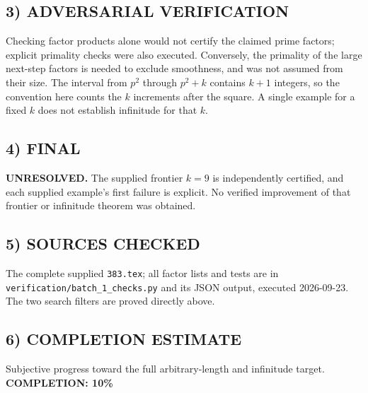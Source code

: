 \subsection*{3) ADVERSARIAL VERIFICATION}
Checking factor products alone would not certify the claimed prime factors; explicit primality checks were also executed. Conversely, the primality of the large next-step factors is needed to exclude smoothness, and was not assumed from their size. The interval from $p^2$ through $p^2+k$ contains $k+1$ integers, so the convention here counts the $k$ increments after the square. A single example for a fixed $k$ does not establish infinitude for that $k$.
\subsection*{4) FINAL}
\textbf{UNRESOLVED.} The supplied frontier $k=9$ is independently certified, and each supplied example's first failure is explicit. No verified improvement of that frontier or infinitude theorem was obtained.
\subsection*{5) SOURCES CHECKED}
The complete supplied \texttt{383.tex}; all factor lists and tests are in \texttt{verification/batch\_1\_checks.py} and its JSON output, executed 2026-09-23. The two search filters are proved directly above.
\subsection*{6) COMPLETION ESTIMATE}
Subjective progress toward the full arbitrary-length and infinitude target.
\textbf{COMPLETION: 10\%}
